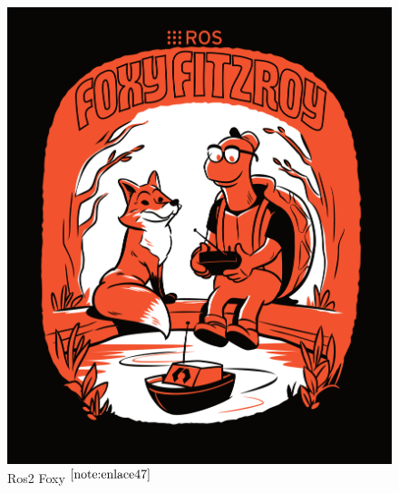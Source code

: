 \begin{figure}[ht!]
	\centering
	\begin{minipage}{0.4\linewidth}
		\centering
		\includegraphics[width=\linewidth]{figs/foxy.png}
		\caption*{\centering Ros2 Foxy $^{\ref{note:enlace47}}$} %
	\end{minipage}
	\hspace{2cm}
	\begin{minipage}{0.35\linewidth}
		\centering

\end{minipage}
\end{figure}
